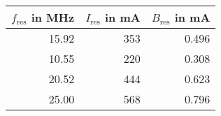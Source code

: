 \begin{tabular}{rrr}
\toprule
$f_\mathrm{res}$ in \si{\mega\hertz} & $I_\mathrm{res}$ in \si{\milli\ampere} & $B_\mathrm{res}$ in \si{\milli\ampere} \\
\midrule
                               15.92 &                                    353 &                                  0.496 \\
                               10.55 &                                    220 &                                  0.308 \\
                               20.52 &                                    444 &                                  0.623 \\
                               25.00 &                                    568 &                                  0.796 \\
\bottomrule
\end{tabular}
